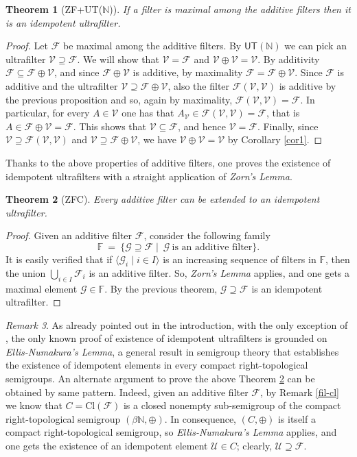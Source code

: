 \documentclass{amsart}
\newtheorem{theorem}{Theorem}[section]
\theoremstyle{definition}
\theoremstyle{remark}
\newtheorem{remark}[theorem]{Remark}
\def\F{\mathscr{F}}
\def\G{\mathscr{G}}
\def\U{\mathscr{U}}
\def\V{\mathscr{V}}
\def\N{\mathbb{N}}
\begin{document}
\begin{theorem}[\textsf{ZF+UT}($\N$)]
If a filter is maximal among the additive filters
then it is an idempotent ultrafilter.
\end{theorem}

\begin{proof}
Let $\F$ be maximal among the additive filters.
By $\textsf{UT}(\N)$ we can pick an ultrafilter $\V\supseteq\F$.
We will show that $\V=\F$ and $\V\oplus\V=\V$.
By additivity $\F\subseteq\F\oplus\V$, and
since $\F\oplus\V$ is additive, by maximality
$\F=\F\oplus\V$. Since $\F$ is additive and the ultrafilter
$\V\supseteq\F\oplus\V$, also
the filter $\F(\V,\V)$ is additive by the previous
proposition and so, again by maximality, $\F(\V,\V)=\F$.
In particular, for every $A\in\V$ one has
that $A_\V\in\F(\V,\V)=\F$, that is
$A\in\F\oplus\V=\F$. This shows that $\V\subseteq\F$,
and hence $\V=\F$. Finally, since 
$\V\supseteq\F(\V,\V)$ and $\V\supseteq\F\oplus\V$, 
we have $\V\oplus\V=\V$ by Corollary \ref{cor1}.
\end{proof}

Thanks to the above properties of additive filters,
one proves the existence of idempotent ultrafilters
with a straight application of \emph{Zorn's Lemma}.

\begin{theorem}[\textsf{ZFC}]\label{maintheorem}
Every additive filter can be extended to an idempotent ultrafilter.
\end{theorem}

\begin{proof}
Given an additive filter $\F$, consider the following family
$$\mathbb{F}\ =\ \{\G\supseteq\F\mid\ \G\ \text{is an additive filter}\}.$$
It is easily verified that if $\langle \G_i\mid i\in I\rangle$ is an increasing
sequence of filters in $\mathbb{F}$,
then the union $\bigcup_{i\in I}\F_i$ is an additive filter.
So, \emph{Zorn's Lemma} applies, and one gets
a maximal element $\G\in\mathbb{F}$.
By the previous theorem, $\G\supseteq\F$ is an 
idempotent ultrafilter.
\end{proof}


\begin{remark}
As already pointed out in the introduction, with the only
exception of \cite{p}, the only known proof 
of existence of idempotent ultrafilters
is grounded on \emph{Ellis-Numakura's Lemma}, a general
result in semigroup theory that establishes the existence of idempotent 
elements in every compact right-topological semigroups.
An alternate argument to prove the above Theorem \ref{maintheorem}
can be obtained by same pattern.
Indeed, given an additive filter $\F$, by Remark \ref{fil-cl}
we know that $C=\text{Cl}(\F)$ is a closed nonempty sub-semigroup
of the compact right-topological semigroup $(\beta\N,\oplus)$.
In consequence, $(C,\oplus)$ is itself
a compact right-topological semigroup, so
\emph{Ellis-Numakura's Lemma} applies, and one gets
the existence of an idempotent
element $\U\in C$; clearly, $\U\supseteq\F$.
\end{remark}
\end{document}
